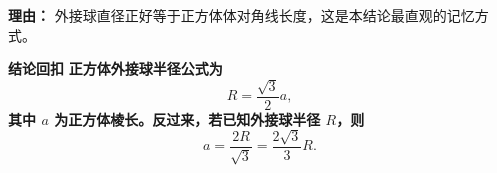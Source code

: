 \begin{proofbox}
\begin{description}[style=nextline, leftmargin=2.8em, labelsep=0.5em, itemsep=0.55em]
		      \par\textbf{理由：}
		      外接球直径正好等于正方体体对角线长度，这是本结论最直观的记忆方式。
	\end{description}

	\medskip
	\textbf{\textcolor{CProof}{结论回扣}}
	\textbf{正方体外接球半径公式为}
	\[
		R=\frac{\sqrt{3}}{2}a,
	\]
	\textbf{其中 $a$ 为正方体棱长。反过来，若已知外接球半径 $R$，则}
	\[
		a=\frac{2R}{\sqrt{3}}=\frac{2\sqrt{3}}{3}R.
	\]
\end{proofbox}